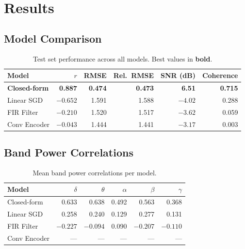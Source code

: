 \documentclass[11pt,a4paper]{article}
\begin{document}
\section{Results}

\subsection{Model Comparison}

\begin{table}[H]
\centering
\caption{Test set performance across all models. Best values in \textbf{bold}.}
\label{tab:results}
\begin{tabular}{lrrrrr}
\toprule
Model & $r$ & RMSE & Rel.\ RMSE & SNR (dB) & Coherence \\
\midrule
\textbf{Closed-form} & \textcolor{good}{\textbf{0.887}} & \textcolor{good}{\textbf{0.474}} & \textcolor{good}{\textbf{0.473}} & \textcolor{good}{\textbf{6.51}} & \textcolor{good}{\textbf{0.715}} \\
Linear SGD & \textcolor{bad}{$-0.652$} & \textcolor{bad}{1.591} & \textcolor{bad}{1.588} & \textcolor{bad}{$-4.02$} & 0.288 \\
FIR Filter & \textcolor{bad}{$-0.210$} & \textcolor{bad}{1.520} & \textcolor{bad}{1.517} & \textcolor{bad}{$-3.62$} & 0.059 \\
Conv Encoder & \textcolor{bad}{$-0.043$} & \textcolor{bad}{1.444} & \textcolor{bad}{1.441} & \textcolor{bad}{$-3.17$} & 0.003 \\
\bottomrule
\end{tabular}
\end{table}

\subsection{Band Power Correlations}

\begin{table}[H]
\centering
\caption{Mean band power correlations per model.}
\label{tab:bandpower}
\begin{tabular}{lrrrrr}
\toprule
Model & $\delta$ & $\theta$ & $\alpha$ & $\beta$ & $\gamma$ \\
\midrule
Closed-form & 0.633 & 0.638 & 0.492 & 0.563 & 0.368 \\
Linear SGD  & 0.258 & 0.240 & 0.129 & 0.277 & 0.131 \\
FIR Filter  & $-0.227$ & $-0.094$ & 0.090 & $-0.207$ & $-0.110$ \\
Conv Encoder & --- & --- & --- & --- & --- \\
\bottomrule
\end{tabular}
\end{table}
\end{document}

